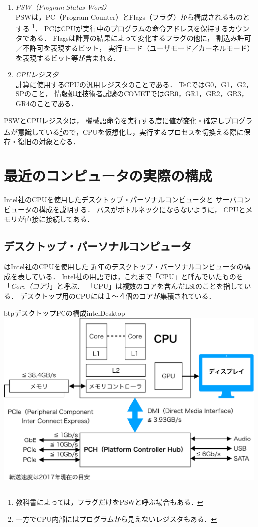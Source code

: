 \begin{enumerate}
\item \emph{PSW（Program Status Word）} \\
  PSWは，PC（Program Counter）とFlags（フラグ）から構成されるものとする
  \footnote{
    教科書によっては，フラグだけをPSWと呼ぶ場合もある．}．
  PCはCPUが実行中のプログラムの命令アドレスを保持するカウンタである．
  Flagsは計算の結果によって変化するフラグの他に，
  割込み許可／不許可を表現するビット，
  実行モード（ユーザモード／カーネルモード）を表現するビット等が含まれる．
\item \emph{CPUレジスタ} \\
  計算に使用するCPUの汎用レジスタのことである．
  TeCではG0，G1，G2，SPのこと，
  情報処理技術者試験のCOMETではGR0，GR1，GR2，GR3，GR4のことである．
\end{enumerate}

PSWとCPUレジスタは，
機械語命令を実行する度に値が変化・確定しプログラムが意識している\footnote{
  一方でCPU内部にはプログラムから見えないレジスタもある．
}ので，CPUを仮想化し，実行するプロセスを切換える際に保存・復旧の対象となる．

\section{最近のコンピュータの実際の構成}
Intel社のCPUを使用したデスクトップ・パーソナルコンピュータと
サーバコンピュータの構成を説明する．
バスがボトルネックにならないように，
CPUとメモリが直接に接続してある．

\subsection{デスクトップ・パーソナルコンピュータ}
はIntel社のCPUを使用した
近年のデスクトップ・パーソナルコンピュータの構成を表している．
Intel社の用語では，これまで「CPU」と呼んでいたものを
「\emph{Core（コア）}」と呼ぶ．
「CPU」は複数のコアを含んだLSIのことを指している．
デスクトップ用のCPUには１〜４個のコアが集積されている．

\begin{myfig}{btp}{デスクトップPCの構成}{intelDesktop}
  \includegraphics[scale=0.66]{Fig/intelDesktop-crop.pdf}
\end{myfig}

